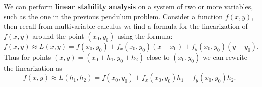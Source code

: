 
We can perform \textbf{linear stability analysis} on a system of two or more variables, such as the one in the previous pendulum problem. Consider a function $f(x,y)$, then recall from multivariable calculus we find a formula for the linearization of $f(x,y)$ around the point $(x_0,y_0)$ using the formula:
\[ f(x,y) \approx L(x,y) = f(x_0,y_0) + f_x(x_0,y_0)(x-x_0) + f_y(x_0,y_0)(y-y_0). \]
Thus for points $(x,y)=(x_0+h_1,y_0+h_2)$ close to $(x_0,y_0)$ we can rewrite the linearization as 
\[ f(x,y) \approx L(h_1,h_2) = f(x_0,y_0) + f_x(x_0,y_0)h_1 + f_y(x_0,y_0)h_2. \]

